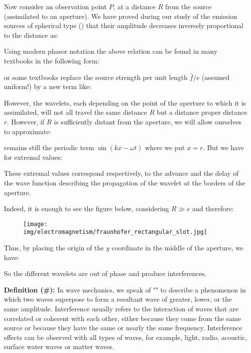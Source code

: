 	Now consider an observation point $P$, at a distance $R$ from the source (assimilated to an aperture). We have proved during our study of the emission sources of spherical type  () that their amplitude decreases inversely proportional to the distance as:
	
	
	\begin{tcolorbox}[title=Remark,colframe=black,arc=10pt]
	Using modern phasor notation the above relation can be found in many textbooks in the following form:
	
	or some textbooks replace the source strength per unit length $\hat{f}/e$ (assumed uniform!) by a new term like:
	
	\end{tcolorbox}
	
	However, the wavelets, each depending on the point of the aperture to which it is assimilated, will not all travel the same distance $R$ but a distance proper distance $r$. However, if $R$ is sufficiently distant from the aperture, we will allow ourselves to approximate:
	
	remains still the periodic term $\sin(kx-\omega t)$ where we put $x=r$. But we have for extremal values:
	
	These extremal values correspond respectively, to the  advance and the delay of the wave function describing the propagation of the wavelet at the borders of the aperture.
	
	Indeed, it is enough to see the figure below, considering $R \gg e$ and therefore:
	
	\begin{figure}[H]
		\centering
		\texttt{[image: img/electromagnetism/fraunhofer\_rectangular\_slot.jpg]}
	\end{figure}
	Thus, by placing the origin of the $y$ coordinate in the middle of the aperture, we have:
	
	So the different wavelets are out of phase and produce interferences.
	
	\textbf{Definition (\#\mydef):} In wave mechanics, we speak of "" to describe a phenomenon in which two waves superpose to form a resultant wave of greater, lower, or the same amplitude. Interference usually refers to the interaction of waves that are correlated or coherent with each other, either because they come from the same source or because they have the same or nearly the same frequency. Interference effects can be observed with all types of waves, for example, light, radio, acoustic, surface water waves or matter waves.
	
